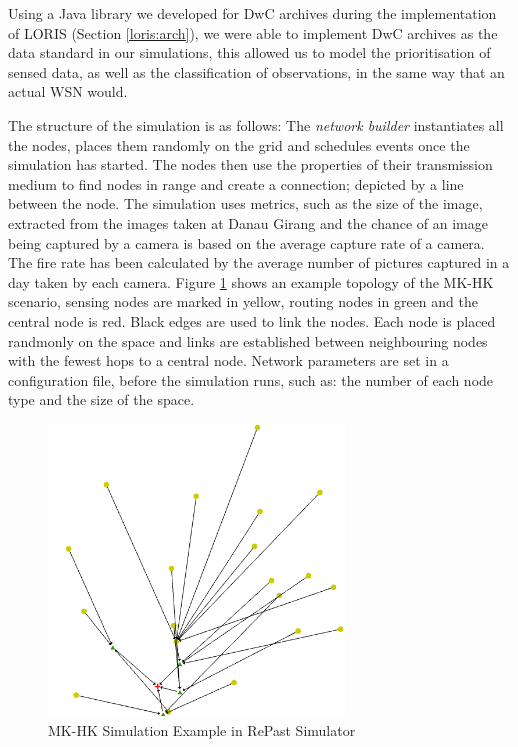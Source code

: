 Using a Java library we developed for DwC archives during the implementation of LORIS (Section \ref{loris:arch}), we were able to implement DwC archives as the data standard in our simulations, this allowed us to model the prioritisation of sensed data, as well as the classification of observations, in the same way that an actual WSN would.

The structure of the simulation is as follows: The \textit{network builder} instantiates all the nodes, places them randomly on the grid and schedules events once the simulation has started. The nodes then use the properties of their transmission medium to find nodes in range and create a connection; depicted by a line between the node. The simulation uses metrics, such as the size of the image, extracted from the images taken at Danau Girang and the chance of an image being captured by a camera is based on the average capture rate of a camera. The fire rate has been calculated by the average number of pictures captured in a day taken by each camera. Figure \ref{fig:sim} shows an example topology of the MK-HK scenario, sensing nodes are marked in yellow, routing nodes in green and the central node is red. Black edges are used to link the nodes. Each node is placed randmonly on the space and links are established between neighbouring nodes with the fewest hops to a central node. Network parameters are set in a configuration file, before the simulation runs, such as: the number of each node type and the size of the space.


	\begin{figure}[h]
	\centering
	\includegraphics[width=0.70\textwidth]{Chap7/figures/khas_sim}
	\caption{MK-HK Simulation Example in RePast Simulator}
	\label{fig:sim}
	\end{figure}


